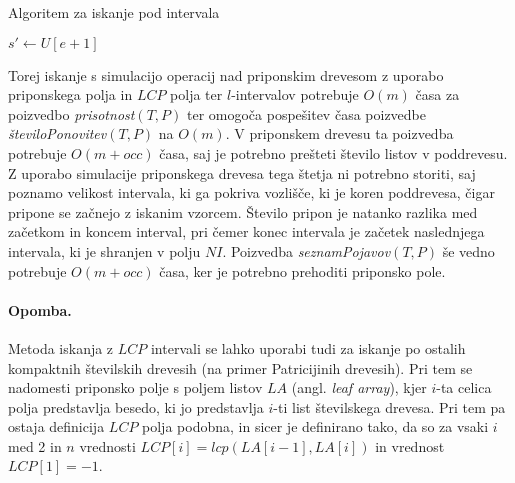 \begin{algorithm}[htb]

    \caption{Algoritem za iskanje pod intervala }\label{alg:interval}
    {
                    {$s'\leftarrow U[e+1]$}

            {\Vrni{$[s,s'-1]$}}


                {\Vrni{$[s',e]$}}
        
        {\Vrni{$[-1,-1]$}}    
    }
\end{algorithm}


Torej iskanje s simulacijo operacij nad priponskim drevesom z uporabo priponskega polja in $LCP$ polja ter $l$-intervalov potrebuje $O(m)$ časa za poizvedbo \textit{prisotnost}$(T,P)$ ter omogoča pospešitev časa poizvedbe \textit{številoPonovitev}$(T,P)$ na $O(m)$. V priponskem drevesu ta poizvedba potrebuje $O(m+occ)$ časa, saj je potrebno prešteti število listov v poddrevesu. Z uporabo simulacije priponskega drevesa tega štetja ni potrebno storiti, saj poznamo velikost intervala, ki ga pokriva vozlišče, ki je koren poddrevesa, čigar pripone se začnejo z iskanim vzorcem. Število pripon je natanko razlika med začetkom in koncem interval, pri čemer konec intervala je začetek naslednjega intervala, ki je shranjen v polju $NI$. Poizvedba \textit{seznamPojavov}$(T,P)$ še vedno potrebuje $O(m+occ)$ časa, ker je potrebno prehoditi priponsko pole.

\paragraph{Opomba.}
Metoda iskanja z $LCP$ intervali se lahko uporabi tudi za iskanje po ostalih kompaktnih številskih drevesih (na primer Patricijinih drevesih). Pri tem se nadomesti priponsko polje s poljem listov $LA$ (angl. \textit{leaf array}), kjer $i$-ta celica polja predstavlja besedo, ki jo predstavlja $i$-ti list številskega drevesa. Pri tem pa ostaja definicija $LCP$ polja podobna, in sicer je definirano tako, da so za vsaki $i$ med 2 in $n$ vrednosti $LCP[i]=lcp(LA[i-1],LA[i])$ in vrednost $LCP[1]=-1$.
